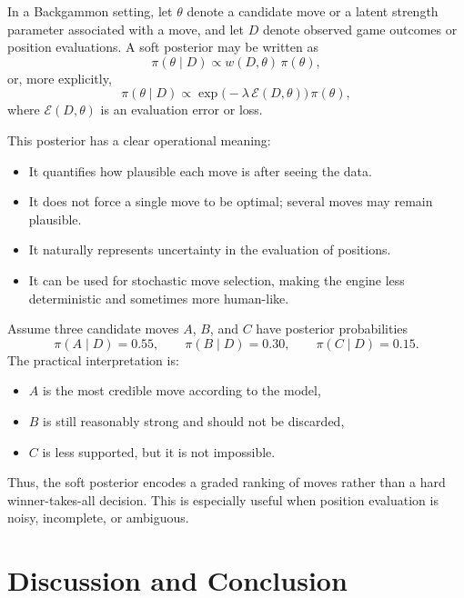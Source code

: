 \documentclass[twoside]{article}
\begin{document}
\begin{rem}
In a Backgammon setting, let $\theta$ denote a candidate move or a latent strength parameter associated with a move, and let $D$ denote observed game outcomes or position evaluations. A soft posterior may be written as
\[
\pi(\theta\mid D)\propto w(D,\theta)\,\pi(\theta),
\]
or, more explicitly,
\[
\pi(\theta\mid D)\propto \exp\!\bigl(-\lambda\,\mathcal{E}(D,\theta)\bigr)\,\pi(\theta),
\]
where $\mathcal{E}(D,\theta)$ is an evaluation error or loss.

This posterior has a clear operational meaning:

\begin{itemize}
  \item It quantifies how plausible each move is after seeing the data.
  \item It does not force a single move to be optimal; several moves may remain plausible.
  \item It naturally represents uncertainty in the evaluation of positions.
  \item It can be used for stochastic move selection, making the engine less deterministic and sometimes more human-like.
\end{itemize}
\end{rem}

\begin{eg}
Assume three candidate moves $A$, $B$, and $C$ have posterior probabilities
\[
\pi(A\mid D)=0.55,\qquad \pi(B\mid D)=0.30,\qquad \pi(C\mid D)=0.15.
\]
The practical interpretation is:

\begin{itemize}
  \item $A$ is the most credible move according to the model,
  \item $B$ is still reasonably strong and should not be discarded,
  \item $C$ is less supported, but it is not impossible.
\end{itemize}

Thus, the soft posterior encodes a graded ranking of moves rather than a hard winner-takes-all decision. This is especially useful when position evaluation is noisy, incomplete, or ambiguous.
\end{eg}

\section*{Discussion and Conclusion}   
\label{sec:conclusion}
\end{document}
